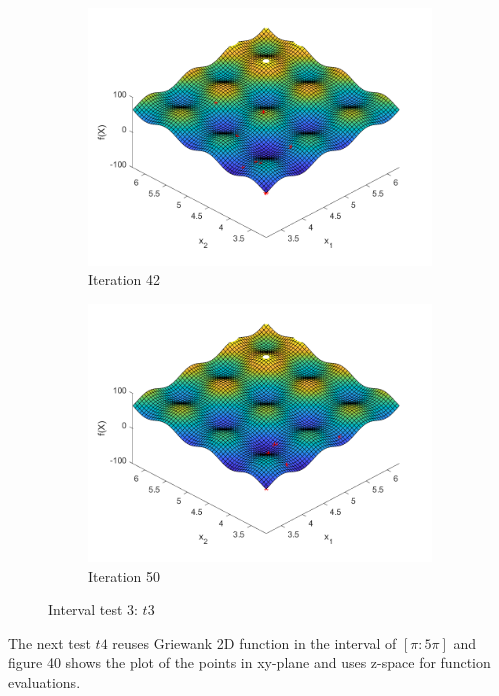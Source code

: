 \begin{figure}
\begin{subfigure}[b]{0.4\textwidth}
   \includegraphics[width=\textwidth]{img/smpl/rast2dshft/loa-iter-42}
   \caption{Iteration 42}
   \label{fig:s3-iter-6}
 \end{subfigure}
 \begin{subfigure}[b]{0.4\textwidth}
   \includegraphics[width=\textwidth]{img/smpl/rast2dshft/loa-iter-50}
   \caption{Iteration 50}
   \label{fig:s3-iter-7}
 \end{subfigure}
 \caption{Interval test 3: $t3$}
\end{figure}

\par The next test $t4$ reuses Griewank 2D function in the interval of $[\pi:5\pi]$ and figure 40 shows the plot of the points in xy-plane and uses z-space for function evaluations.

